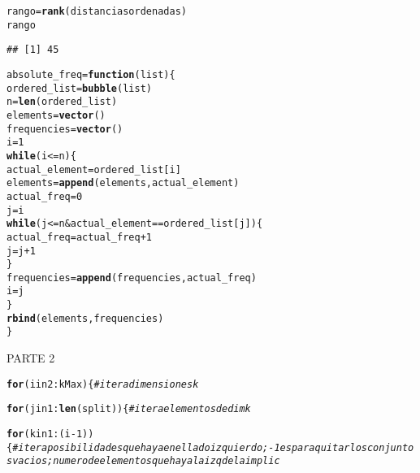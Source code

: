 \documentclass[12pt]{report}\usepackage[]{graphicx}\usepackage[dvipsnames]{xcolor}
\makeatletter
\newcommand{\hlnum}[1]{\textcolor[rgb]{0.686,0.059,0.569}{#1}}%
\newcommand{\hlcom}[1]{\textcolor[rgb]{0.678,0.584,0.686}{\textit{#1}}}%
\newcommand{\hlopt}[1]{\textcolor[rgb]{0,0,0}{#1}}%
\newcommand{\hlstd}[1]{\textcolor[rgb]{0.345,0.345,0.345}{#1}}%
\newcommand{\hlkwa}[1]{\textcolor[rgb]{0.161,0.373,0.58}{\textbf{#1}}}%
\newcommand{\hlkwb}[1]{\textcolor[rgb]{0.69,0.353,0.396}{#1}}%
\newcommand{\hlkwc}[1]{\textcolor[rgb]{0.333,0.667,0.333}{#1}}%
\newcommand{\hlkwd}[1]{\textcolor[rgb]{0.737,0.353,0.396}{\textbf{#1}}}%
\newenvironment{kframe}{%
 \def\at@end@of@kframe{}%
 \ifinner\ifhmode%
  \def\at@end@of@kframe{\end{minipage}}%
  \begin{minipage}{\columnwidth}%
 \fi\fi%
 \def\FrameCommand##1{\hskip\@totalleftmargin \hskip-\fboxsep
 \colorbox{shadecolor}{##1}\hskip-\fboxsep
     \hskip-\linewidth \hskip-\@totalleftmargin \hskip\columnwidth}%
 \MakeFramed {\advance\hsize-\width
   \@totalleftmargin\z@ \linewidth\hsize
   \@setminipage}}%
 {\par\unskip\endMakeFramed%
 \at@end@of@kframe}
\newenvironment{knitrout}{}{} %
\makeatother
\begin{document}
\begin{knitrout}
\begin{kframe}
\begin{alltt}
\hlstd{rango} \hlkwb{=} \hlkwd{rank}\hlstd{(distanciasordenadas)}
\hlstd{rango}
\end{alltt}
\begin{verbatim}
## [1] 45
\end{verbatim}
\begin{alltt}
\hlstd{absolute_freq} \hlkwb{=} \hlkwa{function}\hlstd{(}\hlkwc{list}\hlstd{)\{}
        \hlstd{ordered_list} \hlkwb{=} \hlkwd{bubble}\hlstd{(list)}
        \hlstd{n} \hlkwb{=} \hlkwd{len}\hlstd{(ordered_list)}
        \hlstd{elements} \hlkwb{=} \hlkwd{vector}\hlstd{()}
        \hlstd{frequencies} \hlkwb{=} \hlkwd{vector}\hlstd{()}
        \hlstd{i} \hlkwb{=} \hlnum{1}
        \hlkwa{while} \hlstd{(i} \hlopt{<=} \hlstd{n)\{}
                \hlstd{actual_element} \hlkwb{=} \hlstd{ordered_list[i]}
                \hlstd{elements} \hlkwb{=} \hlkwd{append}\hlstd{(elements, actual_element)}
                \hlstd{actual_freq} \hlkwb{=} \hlnum{0}
                \hlstd{j} \hlkwb{=} \hlstd{i}
                \hlkwa{while}\hlstd{(j} \hlopt{<=} \hlstd{n} \hlopt{&} \hlstd{actual_element} \hlopt{==} \hlstd{ordered_list[j])\{}
                        \hlstd{actual_freq} \hlkwb{=} \hlstd{actual_freq} \hlopt{+} \hlnum{1}
                        \hlstd{j} \hlkwb{=} \hlstd{j}\hlopt{+}\hlnum{1}
                \hlstd{\}}
                \hlstd{frequencies} \hlkwb{=} \hlkwd{append}\hlstd{(frequencies, actual_freq)}
                \hlstd{i} \hlkwb{=} \hlstd{j}
        \hlstd{\}}
        \hlkwd{rbind}\hlstd{(elements, frequencies)}
\hlstd{\}}
\end{alltt}
\end{kframe}
\end{knitrout}

PARTE 2

\begin{knitrout}
\color{fgcolor}\begin{kframe}
\begin{alltt}

\hlkwd{for} (i in 2:kMax) \{ \hlcom{#itera dimensiones k}

\hlkwd{for} (j in 1:\hlkwd{len}(split)) \{ \hlcom{#itera elementos de dim k}

\hlkwd{for} (k in 1:(i-1)) \{ \hlcom{#itera posibilidades que haya en el lado izquierdo; -1 es para quitar los conjuntos vacios; numero de elementos que hay a la izq de la implic}
\end{alltt}


{\ttfamily\noindent\bfseries{}}\end{kframe}
\end{knitrout}
\end{document}
